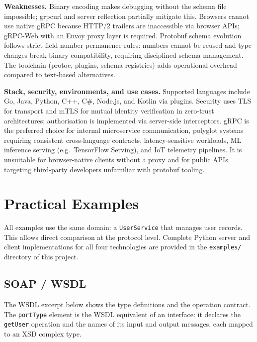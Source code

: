 \documentclass[11pt,a4paper]{article}
\begin{document}
\textbf{Weaknesses.}
Binary encoding makes debugging without the schema file impossible; grpcurl and server
reflection partially mitigate this. Browsers cannot use native gRPC because HTTP/2
trailers are inaccessible via browser APIs; gRPC-Web with an Envoy proxy layer is
required. Protobuf schema evolution follows strict field-number permanence rules: numbers
cannot be reused and type changes break binary compatibility, requiring disciplined schema
management. The toolchain (protoc, plugins, schema registries) adds operational overhead
compared to text-based alternatives.

\textbf{Stack, security, environments, and use cases.}
Supported languages include Go, Java, Python, C++, C\#, Node.js, and Kotlin via plugins.
Security uses TLS for transport and mTLS for mutual identity verification in zero-trust
architectures; authorisation is implemented via server-side interceptors. gRPC is the
preferred choice for internal microservice communication, polyglot systems requiring
consistent cross-language contracts, latency-sensitive workloads, ML inference serving
(e.g.\ TensorFlow Serving), and IoT telemetry pipelines. It is unsuitable for
browser-native clients without a proxy and for public APIs targeting third-party developers
unfamiliar with protobuf tooling.

\section{Practical Examples}

All examples use the same domain: a \texttt{UserService} that manages user records.
This allows direct comparison at the protocol level. Complete Python server and client
implementations for all four technologies are provided in the \texttt{examples/}
directory of this project.

\subsection{SOAP / WSDL}

The WSDL excerpt below shows the type definitions and the operation contract. The
\texttt{portType} element is the WSDL equivalent of an interface: it declares the
\texttt{getUser} operation and the names of its input and output messages, each mapped
to an XSD complex type.
\end{document}
